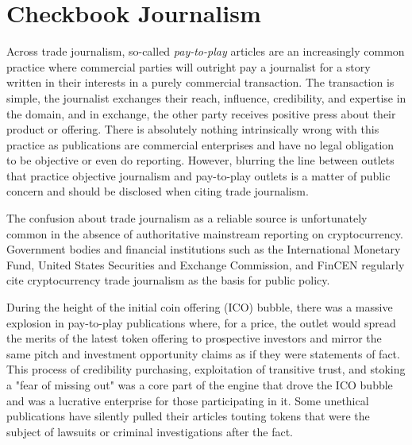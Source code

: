 \section{Checkbook Journalism}

Across trade journalism, so-called \textit{pay-to-play} articles are an
increasingly common practice where commercial parties will outright pay a
journalist for a story written in their interests in a purely commercial
transaction. The transaction is simple, the journalist exchanges their reach,
influence, credibility, and expertise in the domain, and in exchange, the other
party receives positive press about their product or offering. There is
absolutely nothing intrinsically wrong with this practice as publications are
commercial enterprises and have no legal obligation to be objective or even do
reporting.  However, blurring the line between outlets that practice objective
journalism and pay-to-play outlets is a matter of public concern and should be
disclosed when citing trade journalism.

The confusion about trade journalism as a reliable source is unfortunately
common in the absence of authoritative mainstream reporting on cryptocurrency.
Government bodies and financial institutions such as the International Monetary
Fund, United States Securities and Exchange Commission, and FinCEN regularly
cite cryptocurrency trade journalism as the basis for public policy.


During the height of the initial coin offering (ICO) bubble, there was a massive
explosion in pay-to-play publications where, for a price, the outlet would
spread the merits of the latest token offering to prospective investors and
mirror the same pitch and investment opportunity claims as if they were
statements of fact. This process of credibility purchasing, exploitation of
transitive trust, and stoking a "fear of missing out" was a core part of the
engine that drove the ICO bubble and was a lucrative enterprise for those
participating in it. Some unethical publications have silently pulled their
articles touting tokens that were the subject of lawsuits or criminal
investigations after the fact.

